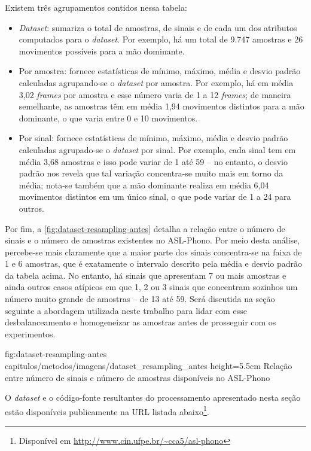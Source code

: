 

Existem três agrupamentos contidos nessa tabela:

\begin{itemize}
    \item \textit{Dataset}: sumariza o total de amostras, de sinais e de cada um dos atributos computados para o \textit{dataset}.
          Por exemplo, há um total de 9.747 amostras e 26 movimentos possíveis para a mão dominante.

    \item Por amostra: fornece estatísticas de mínimo, máximo, média e desvio padrão calculadas agrupando-se o \textit{dataset} por amostra.
          Por exemplo, há em média 3,02 \textit{frames} por amostra e esse número varia de 1 a 12 \textit{frames}; de maneira semelhante, as amostras têm em média 1,94 movimentos distintos para a mão dominante, o que varia entre 0 e 10 movimentos.

    \item Por sinal: fornece estatísticas de mínimo, máximo, média e desvio padrão calculadas agrupado-se o \textit{dataset} por sinal.
          Por exemplo, cada sinal tem em média 3,68 amostras e isso pode variar de 1 até 59 -- no entanto, o desvio padrão nos revela que tal variação concentra-se muito mais em torno da média; nota-se também que a mão dominante realiza em média 6,04 movimentos distintos em um único sinal, o que pode variar de 1 a 24 para outros.

\end{itemize}


Por fim, a \autoref{fig:dataset-resampling-antes} detalha a relação entre o número de sinais e o número de amostras existentes no ASL-Phono. Por meio desta análise, percebe-se mais claramente que a maior parte dos sinais concentra-se na faixa de 1 e 6 amostras, que é exatamente o intervalo descrito pela média e desvio padrão da tabela acima.
No entanto, há sinais que apresentam 7 ou mais amostras e ainda outros casos atípicos em que 1, 2 ou 3 sinais que concentram sozinhos um número muito grande de amostras -- de 13 até 59.
Será discutida na seção seguinte a abordagem utilizada neste trabalho para lidar com esse desbalanceamento e homogeneizar as amostras antes de prosseguir com os experimentos.

\figura
{fig:dataset-resampling-antes} %
{capitulos/metodos/imagens/dataset_resampling_antes} %
{height=5.5cm} %
{Relação entre número de sinais e número de amostras disponíveis no ASL-Phono} %
{} %


O \textit{dataset} e o código-fonte resultantes do processamento apresentado nesta seção estão disponíveis publicamente na URL listada abaixo\footnote{Disponível em \url{http://www.cin.ufpe.br/~cca5/asl-phono}}.

